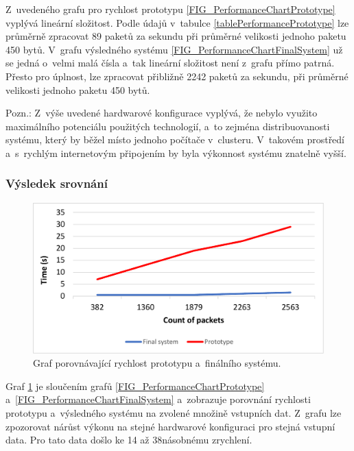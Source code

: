 Z~uvedeného grafu pro rychlost prototypu \ref{FIG_PerformanceChartPrototype} vyplývá lineární složitost. Podle údajů v~tabulce \ref{tablePerformancePrototype} lze průměrně zpracovat 89 paketů za sekundu při průměrné velikosti jednoho paketu 450 bytů. V~grafu výsledného systému \ref{FIG_PerformanceChartFinalSystem} už se jedná o~velmi malá čísla a~tak lineární složitost není z~grafu přímo patrná. Přesto pro úplnost, lze zpracovat přibližně 2242 paketů za sekundu, při průměrné velikosti jednoho paketu 450 bytů.

\vspace{0.5cm}
\noindent Pozn.: Z~výše uvedené hardwarové konfigurace vyplývá, že nebylo využito maximálního potenciálu použitých technologií, a~to zejména distribuovanosti systému, který by běžel místo jednoho počítače v~clusteru. V~takovém prostředí a~s~rychlým internetovým připojením by byla výkonnost systému znatelně vyšší.

\subsubsection{Výsledek srovnání}

\begin{figure}[!h]
    \centering
    \includegraphics[width=15cm]{template-fig/PerformanceChartComparePrototypeAndFinal.pdf}
    \caption{Graf porovnávající rychlost prototypu a~finálního systému.}
    \label{FIG_PerformanceChartComparePrototypeAndFinal}
\end{figure}

\noindent Graf \ref{FIG_PerformanceChartComparePrototypeAndFinal} je sloučením grafů \ref{FIG_PerformanceChartPrototype} a~\ref{FIG_PerformanceChartFinalSystem} a~zobrazuje porovnání rychlosti prototypu a~výsledného systému na zvolené množině vstupních dat. Z~grafu lze zpozorovat nárůst výkonu na stejné hardwarové konfiguraci pro stejná vstupní data. Pro tato data došlo ke 14 až 38násobnému zrychlení.

